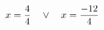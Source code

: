 \documentclass[preview]{standalone}
\begin{document}
\begin{align*}
\special{dvisvgm:raw <g id='unique000'>}x=\frac{4}{4} \quad \lor \quad x=\frac{-12}{4}\special{dvisvgm:raw </g>}
\end{align*}
\end{document}
